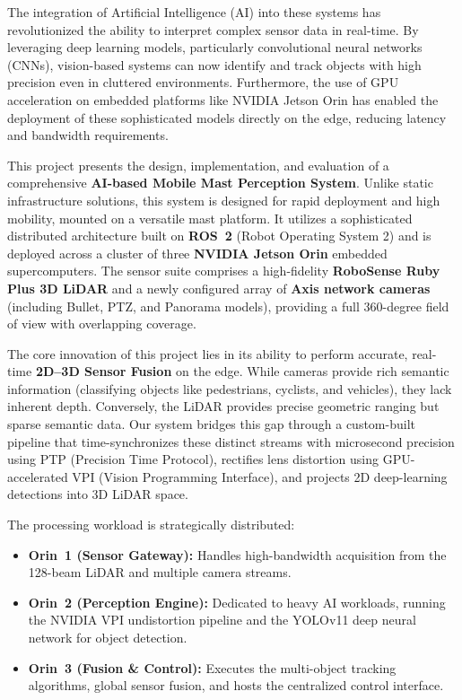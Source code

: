 \documentclass[12pt,a4paper]{report}
\begin{document}
The integration of Artificial Intelligence (AI) into these systems has revolutionized the ability to interpret complex sensor data in real-time. By leveraging deep learning models, particularly convolutional neural networks (CNNs), vision-based systems can now identify and track objects with high precision even in cluttered environments. Furthermore, the use of GPU acceleration on embedded platforms like NVIDIA Jetson Orin has enabled the deployment of these sophisticated models directly on the edge, reducing latency and bandwidth requirements.

This project presents the design, implementation, and evaluation of a comprehensive \textbf{AI-based Mobile Mast Perception System}. Unlike static infrastructure solutions, this system is designed for rapid deployment and high mobility, mounted on a versatile mast platform. It utilizes a sophisticated distributed architecture built on \textbf{ROS~2} (Robot Operating System 2) and is deployed across a cluster of three \textbf{NVIDIA Jetson Orin} embedded supercomputers. The sensor suite comprises a high-fidelity \textbf{RoboSense Ruby Plus 3D LiDAR} and a newly configured array of \textbf{Axis network cameras} (including Bullet, PTZ, and Panorama models), providing a full 360-degree field of view with overlapping coverage.

The core innovation of this project lies in its ability to perform accurate, real-time \textbf{2D--3D Sensor Fusion} on the edge. While cameras provide rich semantic information (classifying objects like pedestrians, cyclists, and vehicles), they lack inherent depth. Conversely, the LiDAR provides precise geometric ranging but sparse semantic data. Our system bridges this gap through a custom-built pipeline that time-synchronizes these distinct streams with microsecond precision using PTP (Precision Time Protocol), rectifies lens distortion using GPU-accelerated VPI (Vision Programming Interface), and projects 2D deep-learning detections into 3D LiDAR space.

The processing workload is strategically distributed:
\begin{itemize}
    \item \textbf{Orin~1 (Sensor Gateway):} Handles high-bandwidth acquisition from the 128-beam LiDAR and multiple camera streams.
    \item \textbf{Orin~2 (Perception Engine):} Dedicated to heavy AI workloads, running the NVIDIA VPI undistortion pipeline and the YOLOv11 deep neural network for object detection.
    \item \textbf{Orin~3 (Fusion \& Control):} Executes the multi-object tracking algorithms, global sensor fusion, and hosts the centralized control interface.
\end{itemize}
\end{document}
